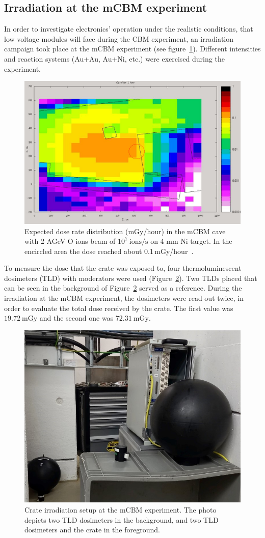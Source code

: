 \subsection{Irradiation at the mCBM experiment}
In order to investigate electronics' operation under the realistic conditions, that low voltage modules will face during the CBM experiment, an irradiation campaign took place at the \gls{mCBM} experiment (see figure~\ref{fig:CBM1}). Different intensities and reaction systems (Au+Au, Au+Ni, etc.) were exercised during the experiment.
\begin{figure}[!h]
    \centering
    \includegraphics[width=0.65\columnwidth]{Chapter4/images/dose1.jpg}
    \caption{Expected dose rate distribution (mGy/hour) in the \gls{mCBM} cave with 2 AGeV O ions beam of $10^{7}\mathrm{\ ions/s}$ on 4 mm Ni target. In the encircled area the dose reached about 0.1\,mGy/hour~\cite{fluka_senger}.}
     \label{fig:CBM1}
\end{figure}


To measure the dose that the crate was exposed to, four thermoluminescent dosimeters (\gls{TLD}) with moderators were used (Figure~\ref{fig:crate}). Two TLDs placed that can be seen in the background of Figure~\ref{fig:crate} served as a reference. During the irradiation at the \gls{mCBM} experiment, the dosimeters were read out twice, in order to evaluate the total dose received by the crate. The first value was $19.72\mathrm{\ mGy}$ and  the second one was $72.31\mathrm{\ mGy}$. 


\newpage
\begin{figure}[!h]
    \centering
    \includegraphics[width=0.5\columnwidth]{Chapter4/images/crate.jpg}
    \caption{Crate irradiation setup at the \gls{mCBM} experiment. The photo depicts two TLD dosimeters in the background, and two TLD dosimeters and the crate in the foreground.}
    \label{fig:crate}
\end{figure}

